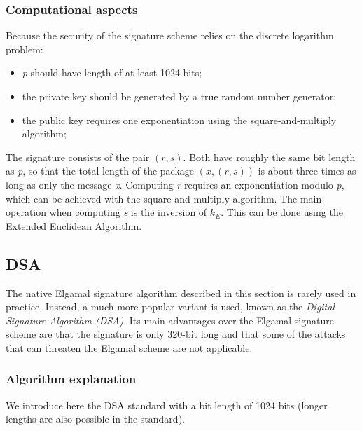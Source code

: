 \documentclass[11pt, a4paper]{article}
\begin{document}
\subsubsection{Computational aspects}
Because the security of the signature scheme relies on the discrete logarithm problem:
\begin{itemize}
    \item \textit{p} should have length of at least 1024 bits;
    \item the private key should be generated by a true random number generator;
    \item the public key requires one exponentiation using the square-and-multiply algorithm;
\end{itemize}
The signature consists of the pair $(r,s)$. Both have roughly the same bit length as \textit{p}, so that the total length of the package $(x,(r,s))$ is about three times as long as only the message \textit{x}. Computing \textit{r} requires an exponentiation modulo \textit{p}, which can be achieved with the square-and-multiply algorithm. The main operation when computing \textit{s} is the inversion of $k_E$. This can be done using the Extended Euclidean Algorithm.

\subsection{DSA}
The native Elgamal signature algorithm described in this section is rarely used in practice. Instead, a much more popular variant is used, known as the \textit{Digital Signature Algorithm (DSA)}. Its main advantages over the Elgamal signature scheme are that the signature is only 320-bit long and that some of the attacks that can threaten the Elgamal scheme are not applicable.

\subsubsection{Algorithm explanation}
We introduce here the DSA standard with a bit length of 1024 bits (longer lengths are also possible in the standard).
\end{document}

